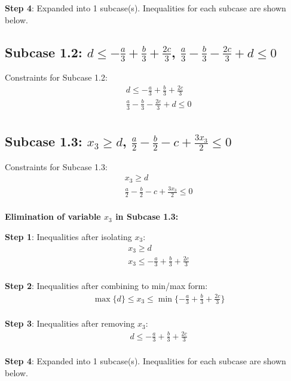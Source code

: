 \documentclass{article}
\begin{document}
\textbf{Step 4}: Expanded into 1 subcase(s). Inequalities for each subcase are shown below.

\subsection{Subcase 1.2: $d \leq - \frac{a}{3} + \frac{b}{3} + \frac{2 c}{3}$, $\frac{a}{3} - \frac{b}{3} - \frac{2 c}{3} + d \leq 0$}

Constraints for Subcase 1.2:
\begin{align}
& d \leq - \frac{a}{3} + \frac{b}{3} + \frac{2 c}{3} \\
& \frac{a}{3} - \frac{b}{3} - \frac{2 c}{3} + d \leq 0 \\
\end{align}

\subsection{Subcase 1.3: $x_{3} \geq d$, $\frac{a}{2} - \frac{b}{2} - c + \frac{3 x_{3}}{2} \leq 0$}

Constraints for Subcase 1.3:
\begin{align}
& x_{3} \geq d \\
& \frac{a}{2} - \frac{b}{2} - c + \frac{3 x_{3}}{2} \leq 0 \\
\end{align}

\textbf{Elimination of variable $x_{3}$ in Subcase 1.3:}

\textbf{Step 1}: Inequalities after isolating $x_{3}$:
\begin{align}
& x_{3} \geq d \\
& x_{3} \leq - \frac{a}{3} + \frac{b}{3} + \frac{2 c}{3} \\
\end{align}

\textbf{Step 2}: Inequalities after combining to min/max form:
\begin{align}
& \max\{d\} \leq x_{3} \leq \min\{- \frac{a}{3} + \frac{b}{3} + \frac{2 c}{3}\} \\
\end{align}

\textbf{Step 3}: Inequalities after removing $x_{3}$:
\begin{align}
& d \leq - \frac{a}{3} + \frac{b}{3} + \frac{2 c}{3} \\
\end{align}

\textbf{Step 4}: Expanded into 1 subcase(s). Inequalities for each subcase are shown below.
\end{document}
